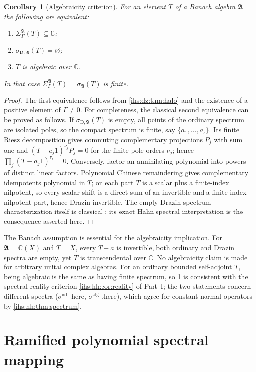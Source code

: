 \documentclass[11pt,a4paper]{article}
\numberwithin{equation}{section}
\newtheorem{corollary}[corollary]{Corollary}
\theoremstyle{definition}
\theoremstyle{remark}
\newcommand{\C}{\mathbb C}
\newcommand{\Alg}{\mathfrak A}
\newcommand{\SigA}{\Sigma^{\Alg}_\Gamma}
\newcommand{\sigD}{\sigma_{\mathrm D,\Alg}}
\begin{document}
\begin{corollary}[Algebraicity criterion]\label{ihs:dz:cor:algebraic}
For an element $T$ of a Banach algebra $\Alg$ the following are equivalent:
\begin{enumerate}[label=\textup{(\roman*)}]
\item $\SigA(T)\subseteq\C$;
\item $\sigD(T)=\varnothing$;
\item $T$ is algebraic over $\C$.
\end{enumerate}
In that case $\SigA(T)=\sigma_\Alg(T)$ is finite.
\end{corollary}
\begin{proof}
The first equivalence follows from \cref{ihs:dz:thm:halo} and the existence
of a positive element of $\Gamma\ne0$. For completeness, the classical second
equivalence can be proved as follows. If $\sigD(T)$ is empty, all points of
the ordinary spectrum are isolated poles, so the compact spectrum is finite,
say $\{a_1,\ldots,a_s\}$. Its finite Riesz decomposition gives commuting
complementary projections $P_j$ with sum one and
$(T-a_j1)^{\nu_j}P_j=0$ for the finite pole orders $\nu_j$; hence
$\prod_j(T-a_j1)^{\nu_j}=0$. Conversely, factor an annihilating polynomial
into powers of distinct linear factors. Polynomial Chinese remaindering gives
complementary idempotents polynomial in $T$; on each part $T$ is a scalar
plus a finite-index nilpotent, so every scalar shift is a direct sum of an
invertible and a finite-index nilpotent part, hence Drazin invertible. The
empty-Drazin-spectrum characterization itself is classical \cite{Boasso};
its exact Hahn spectral interpretation is the consequence asserted here.
\end{proof}

The Banach assumption is essential for the algebraicity implication. For
$\Alg=\C(X)$ and $T=X$, every $T-a$ is invertible, both ordinary and Drazin
spectra are empty, yet $T$ is transcendental over $\C$. No algebraicity claim
is made for arbitrary unital complex algebras. For an ordinary bounded
self-adjoint $T$, being algebraic is the same as having finite spectrum, so
\cref{ihs:dz:cor:algebraic} is consistent with the spectral-reality criterion
\cref{ihs:hh:cor:reality} of Part~I; the two statements concern different
spectra ($\sigma^{\mathrm{adj}}$ here, $\sigma^{\mathrm{alg}}$ there), which
agree for constant normal operators by \cref{ihs:hh:thm:spectrum}.

\section{Ramified polynomial spectral mapping}\label{ihs:dz:sec:poly}
\end{document}
